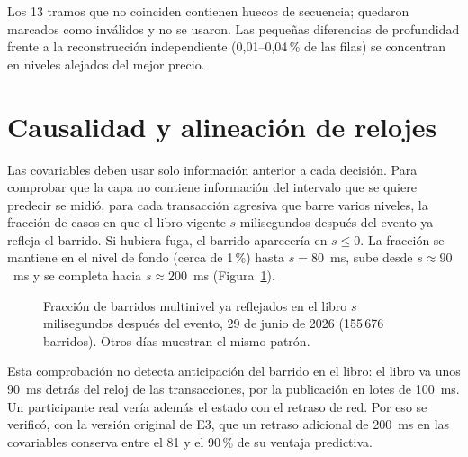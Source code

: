 Los 13 tramos que no coinciden contienen huecos de secuencia; quedaron marcados como inválidos y no se usaron. Las pequeñas diferencias de profundidad frente a la reconstrucción independiente (0,01--0,04\,\% de las filas) se concentran en niveles alejados del mejor precio.

\section{Causalidad y alineación de relojes}
\label{sec:datos-resultados}

Las covariables deben usar solo información anterior a cada decisión. Para comprobar que la capa no contiene información del intervalo que se quiere predecir se midió, para cada transacción agresiva que barre varios niveles, la fracción de casos en que el libro vigente $s$ milisegundos después del evento ya refleja el barrido. Si hubiera fuga, el barrido aparecería en $s\le0$. La fracción se mantiene en el nivel de fondo (cerca de 1\,\%) hasta $s=80$~ms, sube desde $s\approx90$~ms y se completa hacia $s\approx200$~ms (Figura~\ref{fig:reloj}).

\begin{figure}[htbp]
\centering
{}
\caption{Fracción de barridos multinivel ya reflejados en el libro $s$ milisegundos después del evento, 29 de junio de 2026 (155\,676 barridos). Otros días muestran el mismo patrón.}
\label{fig:reloj}
\end{figure}

Esta comprobación no detecta anticipación del barrido en el libro: el libro va unos 90~ms detrás del reloj de las transacciones, por la publicación en lotes de 100~ms. Un participante real vería además el estado con el retraso de red. Por eso se verificó, con la versión original de E3, que un retraso adicional de 200~ms en las covariables conserva entre el 81 y el 90\,\% de su ventaja predictiva.
